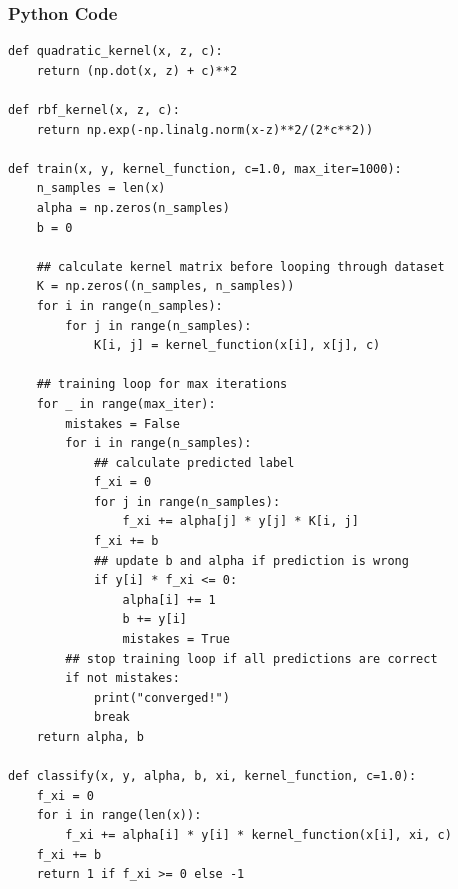 \documentclass{article}
\begin{document}
\subsubsection*{Python Code}
\begin{lstlisting}
def quadratic_kernel(x, z, c):
    return (np.dot(x, z) + c)**2

def rbf_kernel(x, z, c):
    return np.exp(-np.linalg.norm(x-z)**2/(2*c**2))

def train(x, y, kernel_function, c=1.0, max_iter=1000):
    n_samples = len(x)
    alpha = np.zeros(n_samples)
    b = 0
    
    ## calculate kernel matrix before looping through dataset
    K = np.zeros((n_samples, n_samples))
    for i in range(n_samples):
        for j in range(n_samples):
            K[i, j] = kernel_function(x[i], x[j], c)
    
    ## training loop for max iterations
    for _ in range(max_iter):
        mistakes = False    
        for i in range(n_samples):
            ## calculate predicted label
            f_xi = 0
            for j in range(n_samples):
                f_xi += alpha[j] * y[j] * K[i, j]
            f_xi += b           
            ## update b and alpha if prediction is wrong
            if y[i] * f_xi <= 0:
                alpha[i] += 1
                b += y[i]
                mistakes = True        
        ## stop training loop if all predictions are correct
        if not mistakes:
            print("converged!")
            break
    return alpha, b

def classify(x, y, alpha, b, xi, kernel_function, c=1.0):
    f_xi = 0
    for i in range(len(x)):
        f_xi += alpha[i] * y[i] * kernel_function(x[i], xi, c)
    f_xi += b
    return 1 if f_xi >= 0 else -1

\end{lstlisting}
\newpage
\end{document}
